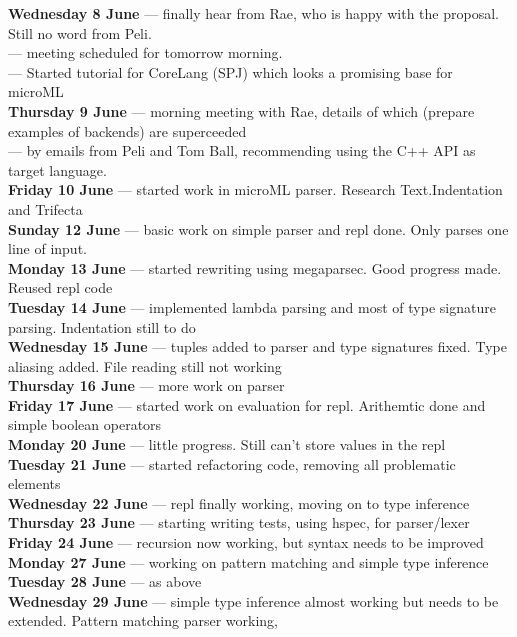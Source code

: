 \textbf{Wednesday 8 June}  --- finally hear from Rae, who is happy with the proposal. Still no word from Peli. \\
\textbf{}  --- meeting scheduled for tomorrow morning. \\
\textbf{}  --- Started tutorial for CoreLang (SPJ) which looks a promising base for microML \\
\textbf{Thursday 9 June}  --- morning meeting with Rae, details of which (prepare examples of backends) are superceeded \\
\textbf{}  --- by emails from Peli and Tom Ball, recommending using the C++ API as target language. \\
\textbf{Friday 10 June}  --- started work in microML parser. Research Text.Indentation and Trifecta \\
\textbf{Sunday 12 June}  --- basic work on simple parser and repl done. Only parses one line of input. \\
\textbf{Monday 13 June}  --- started rewriting using megaparsec. Good progress made. Reused repl code \\
\textbf{Tuesday 14 June}  --- implemented lambda parsing and most of type signature parsing. Indentation still to do \\
\textbf{Wednesday 15 June}  --- tuples added to parser and type signatures fixed. Type aliasing added. File reading still not working \\
\textbf{Thursday 16 June}  --- more work on parser \\
\textbf{Friday 17 June}  --- started work on evaluation for repl. Arithemtic done and simple boolean operators \\
\textbf{Monday 20 June}  --- little progress. Still can't store values in the repl \\
\textbf{Tuesday 21 June}  --- started refactoring code, removing all problematic elements \\
\textbf{Wednesday 22 June}  --- repl finally working, moving on to type inference \\
\textbf{Thursday 23 June}  --- starting writing tests, using hspec, for parser/lexer \\
\textbf{Friday 24 June}  --- recursion now working, but syntax needs to be improved \\
\textbf{Monday 27 June}  --- working on pattern matching and simple type inference \\
\textbf{Tuesday 28 June}  --- as above \\
\textbf{Wednesday 29 June}  --- simple type inference almost working but needs to be extended. Pattern matching parser working, \\

